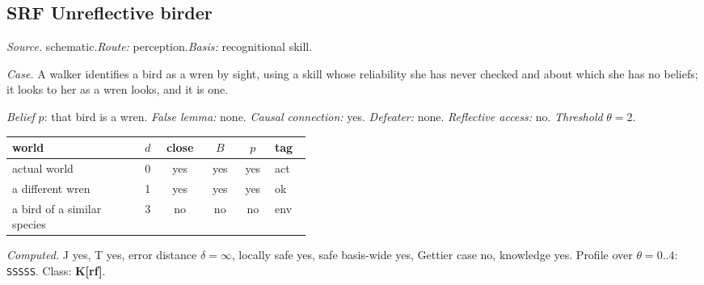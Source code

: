 \subsection*{SRF \enspace Unreflective birder}
\noindent\textit{Source.} schematic.\quad \textit{Route:} perception.\quad \textit{Basis:} recognitional skill.\par
\noindent\textit{Case.} A walker identifies a bird as a wren by sight, using a skill whose reliability she has never checked and about which she has no beliefs; it looks to her as a wren looks, and it is one.\par
\noindent\textit{Belief} $p$: that bird is a wren.
 \textit{False lemma:} none. \textit{Causal connection:} yes. \textit{Defeater:} none. \textit{Reflective access:} no. \textit{Threshold} $\theta = 2$.\par
\begin{center}\begin{tabular}{@{}p{0.43\linewidth}rcccl@{}}
world & $d$ & close & $B$ & $p$ & tag \\ \midrule
actual world & 0 & yes & yes & yes & act \\
a different wren & 1 & yes & yes & yes & ok \\
a bird of a similar species & 3 & no & no & no & env \\
\end{tabular}\end{center}
\noindent\textit{Computed.} J yes, T yes, error distance $\delta = \infty$, locally safe yes, safe basis-wide yes, Gettier case no, knowledge yes. Profile over $\theta = 0..4$: \texttt{SSSSS}. Class: \textbf{K[rf]}.
\par\medskip
{}
